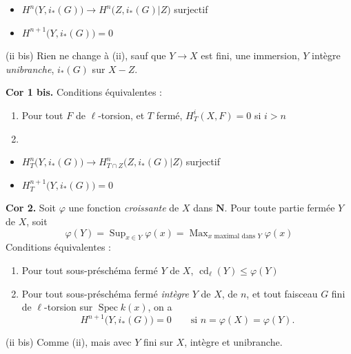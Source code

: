 \documentclass[11pt,a4paper]{article}
\begin{document}
\begin{itemize}
\item[a)] $H^{n}\bigl(Y, i_{*}(G)\bigr) \longrightarrow
  H^{n}\bigl(Z, i_{*}(G)|Z\bigr)$ surjectif
\item[b)] $H^{n+1}\bigl(Y, i_{*}(G)\bigr) = 0$
\end{itemize}


(ii bis) Rien ne change à (ii), sauf que $Y \to X$ est fini, \ill{} une
immersion, $Y$ intègre \emph{unibranche}, $i_{*}(G)$ \ill{} sur $X - Z$.

\textbf{Cor 1 bis.} Conditions équivalentes :
\begin{enumerate}
\item[(i)] Pour tout $F$ de $\ell$-torsion, et $T$ fermé,
  $H^{i}_{T}(X,F) = 0$ si $i > n$
\item[(ii)] \ill{}
\end{enumerate}

\begin{itemize}
\item[a)] $H^{n}_{T}\bigl(Y, i_{*}(G)\bigr) \longrightarrow
  H^{n}_{T \cap Z}\bigl(Z, i_{*}(G)|Z\bigr)$ surjectif
\item[b)] $H^{n+1}_{T}\bigl(Y, i_{*}(G)\bigr) = 0$
\end{itemize}


\textbf{Cor 2.} Soit $\varphi$ une fonction 
\emph{croissante} de \struck{\ill{}} $X$ dans $\mathbf{N}$.
 Pour toute partie fermée $Y$ de $X$, soit
\[
\varphi(Y) = \operatorname{Sup}_{x \in Y} \varphi(x)
 = \operatorname{Max}_{x \text{ maximal dans } Y} \varphi(x)
\]
Conditions équivalentes :
\begin{enumerate}
\item[(i)] Pour tout sous-préschéma fermé $Y$ de $X$,
  $\operatorname{cd}_{\ell}(Y) \leqslant \varphi(Y)$
\item[(ii)] Pour tout sous-préschéma fermé \emph{intègre} $Y$ de $X$, de
  \ill{} $n$, et tout faisceau $G$ fini de $\ell$-torsion sur
  $\operatorname{Spec} k(x)$, on a
  \[
  H^{n+1}\bigl(Y, i_{*}(G)\bigr) = 0 \qquad
  \text{si } n = \varphi(X) = \varphi(Y).
  \]
\end{enumerate}

(ii bis) Comme (ii), mais avec $Y$ fini sur $X$, intègre et unibranche.
\end{document}
